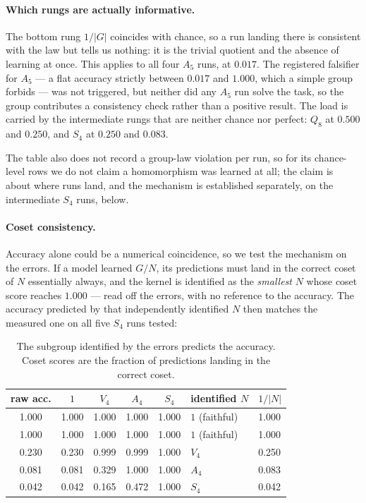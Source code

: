 \documentclass[10pt]{article}
\begin{document}
\paragraph{Which rungs are actually informative.} The bottom rung $1/|G|$ coincides with chance, so a
run landing there is consistent with the law but tells us nothing: it is the trivial quotient and the
absence of learning at once. This applies to all four $A_5$ runs, at $0.017$. The registered
falsifier for $A_5$ --- a flat accuracy strictly between $0.017$ and $1.000$, which a simple group
forbids --- was not triggered, but neither did any $A_5$ run solve the task, so the group contributes
a consistency check rather than a positive result. The load is carried by the intermediate rungs that
are neither chance nor perfect: $Q_8$ at $0.500$ and $0.250$, and $S_4$ at $0.250$ and $0.083$.

The table also does not record a group-law violation per run, so for its chance-level rows we do not
claim a homomorphism was learned at all; the claim is about where runs land, and the mechanism is
established separately, on the intermediate $S_4$ runs, below.

\paragraph{Coset consistency.} Accuracy alone could be a numerical coincidence, so we test the
mechanism on the errors. If a model learned $G/N$, its predictions must land in the correct coset of
$N$ essentially always, and the kernel is identified as the \emph{smallest} $N$ whose coset score
reaches $1.000$ --- read off the errors, with no reference to the accuracy. The accuracy predicted by
that independently identified $N$ then matches the measured one on all five $S_4$ runs tested:

\begin{table}[H]\centering\small
\caption{The subgroup identified by the errors predicts the accuracy. Coset scores are the fraction
of predictions landing in the correct coset.}
\begin{tabular}{cccccll}
\toprule
raw acc. & $1$ & $V_4$ & $A_4$ & $S_4$ & identified $N$ & $1/|N|$ \\
\midrule
1.000 & 1.000 & 1.000 & 1.000 & 1.000 & $1$ (faithful) & 1.000 \\
1.000 & 1.000 & 1.000 & 1.000 & 1.000 & $1$ (faithful) & 1.000 \\
0.230 & 0.230 & 0.999 & 0.999 & 1.000 & $V_4$ & 0.250 \\
0.081 & 0.081 & 0.329 & 1.000 & 1.000 & $A_4$ & 0.083 \\
0.042 & 0.042 & 0.165 & 0.472 & 1.000 & $S_4$ & 0.042 \\
\bottomrule
\end{tabular}
\label{tab:coset}
\end{table}
\end{document}
